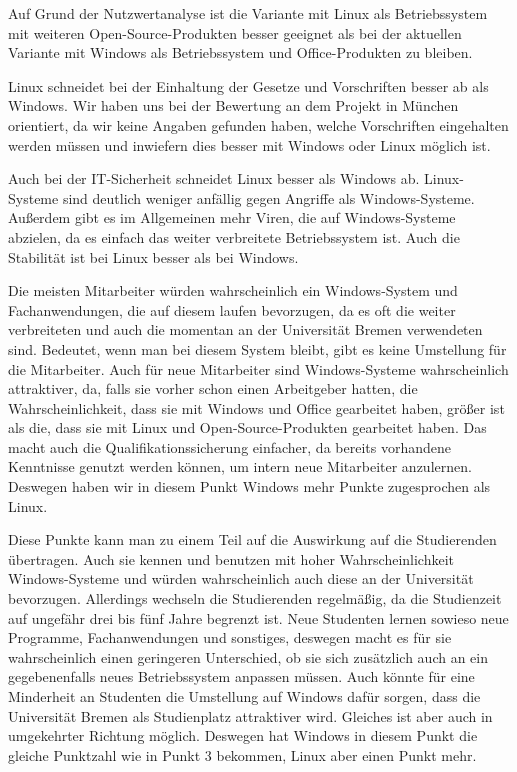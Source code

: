 \documentclass[12pt,utf8]{scrartcl}
\begin{document}
Auf Grund der Nutzwertanalyse ist die Variante mit Linux als Betriebssystem mit weiteren Open-Source-Produkten besser geeignet als bei der aktuellen Variante mit Windows als Betriebssystem und Office-Produkten zu bleiben. 

Linux schneidet bei der Einhaltung der Gesetze und Vorschriften besser ab als Windows. Wir haben uns bei der Bewertung an dem Projekt in München orientiert, da wir keine Angaben gefunden haben, welche Vorschriften eingehalten werden müssen und inwiefern dies besser mit Windows oder Linux möglich ist.

Auch bei der IT-Sicherheit schneidet Linux besser als Windows ab. Linux-Systeme sind deutlich weniger anfällig gegen Angriffe als Windows-Systeme. Außerdem gibt es im Allgemeinen mehr Viren, die auf Windows-Systeme abzielen, da es einfach das weiter verbreitete Betriebssystem ist. Auch die Stabilität ist bei Linux besser als bei Windows.

Die meisten Mitarbeiter würden wahrscheinlich ein Windows-System und Fachanwendungen, die auf diesem laufen bevorzugen, da es oft die weiter verbreiteten und auch die momentan an der Universität Bremen verwendeten sind. Bedeutet, wenn man bei diesem System bleibt, gibt es keine Umstellung für die Mitarbeiter. Auch für neue Mitarbeiter sind Windows-Systeme wahrscheinlich attraktiver, da, falls sie vorher schon einen Arbeitgeber hatten, die Wahrscheinlichkeit, dass sie mit Windows und Office gearbeitet haben, größer ist als die, dass sie mit Linux und Open-Source-Produkten gearbeitet haben. Das macht auch die Qualifikationssicherung einfacher, da bereits vorhandene Kenntnisse genutzt werden können, um intern neue Mitarbeiter anzulernen. Deswegen haben wir in diesem Punkt Windows mehr Punkte zugesprochen als Linux. 

Diese Punkte kann man zu einem Teil auf die Auswirkung auf die Studierenden übertragen. Auch sie kennen und benutzen mit hoher Wahrscheinlichkeit Windows-Systeme und würden wahrscheinlich auch diese an der Universität bevorzugen. Allerdings wechseln die Studierenden regelmäßig, da die Studienzeit auf ungefähr drei bis fünf Jahre begrenzt ist. Neue Studenten lernen sowieso neue Programme, Fachanwendungen und sonstiges, deswegen macht es für sie wahrscheinlich einen geringeren Unterschied, ob sie sich zusätzlich auch an ein gegebenenfalls neues Betriebssystem anpassen müssen. Auch könnte für eine Minderheit an Studenten die Umstellung auf Windows dafür sorgen, dass die Universität Bremen als Studienplatz attraktiver wird. Gleiches ist aber auch in umgekehrter Richtung möglich. Deswegen hat Windows in diesem Punkt die gleiche Punktzahl wie in Punkt 3 bekommen, Linux aber einen Punkt mehr. 
\end{document}
